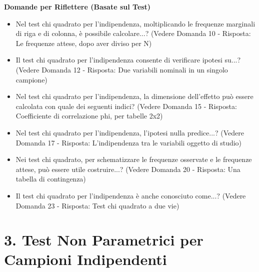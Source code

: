 \documentclass[12pt, a4paper]{article}
\newenvironment{reflectionbox}{%
    \medskip
    \begin{framed}\par\noindent
    \textbf{\color{boxtitlecolor}Domande per Riflettere (Basate sul Test)} \par
    \begin{itemize}[leftmargin=*, label=$\blacktriangleright$]
}{%
    \end{itemize}\par
    \end{framed}
    \medskip
}
\begin{document}
\begin{reflectionbox}
    \item Nel test chi quadrato per l'indipendenza, moltiplicando le frequenze marginali di riga e di colonna, è possibile calcolare...? (Vedere Domanda 10 - Risposta: Le frequenze attese, dopo aver diviso per N)
    \item Il test chi quadrato per l'indipendenza consente di verificare ipotesi su...? (Vedere Domanda 12 - Risposta: Due variabili nominali in un singolo campione)
    \item Nel test chi quadrato per l'indipendenza, la dimensione dell'effetto può essere calcolata con quale dei seguenti indici? (Vedere Domanda 15 - Risposta: Coefficiente di correlazione phi, per tabelle 2x2)
    \item Nel test chi quadrato per l'indipendenza, l'ipotesi nulla predice...? (Vedere Domanda 17 - Risposta: L'indipendenza tra le variabili oggetto di studio)
    \item Nei test chi quadrato, per schematizzare le frequenze osservate e le frequenze attese, può essere utile costruire...? (Vedere Domanda 20 - Risposta: Una tabella di contingenza)
    \item Il test chi quadrato per l'indipendenza è anche conosciuto come...? (Vedere Domanda 23 - Risposta: Test chi quadrato a due vie)
\end{reflectionbox}

\section*{3. Test Non Parametrici per Campioni Indipendenti}
\end{document}
